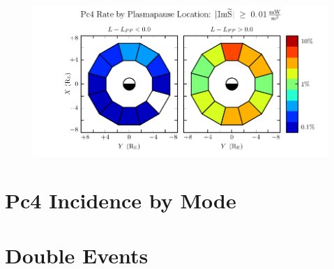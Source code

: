 \begin{figure}[!htb]
    \centering
    \includegraphics[width=\textwidth]{figures/llpp.pdf}
    \caption[Pc4 Rate Inside and Outside the Plasmapause]{
      \todo{$\cdots$}
    }
    \label{fig_llpp}
\end{figure}







\section{Pc4 Incidence by Mode}
  \label{sec_rate}



\todo{$\cdots$}




\section{Double Events}
  \label{sec_double}








